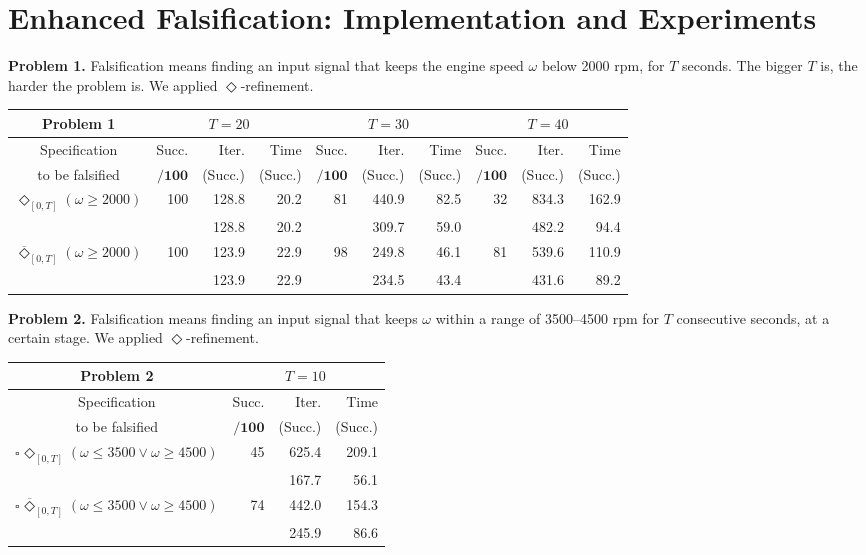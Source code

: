 \documentclass[envcountsect,orivec]{llncs} \usepackage{etex} \usepackage[]{graphicx}
\newcommand{\DiaOp}[1]{\Diamond_{#1}}
\newcommand{\BoxOp}[1]{\square_{#1}}
\newcommand{\TDiaOp}[1]{\overline{\Diamond}_{#1}}
\newcommand{\Succ}{Succ.}
\begin{document}
\section{Enhanced Falsification: Implementation and Experiments}
\label{sec:experiments}


\begin{table}[ptb]
  \scriptsize
  \centering
  \begin{minipage}{\textwidth}
    \textbf{Problem 1. } Falsification means finding an input signal 
    that keeps the engine speed $\omega$ below 2000 rpm, for $T$
    seconds. The bigger $T$ is, the harder the problem is.
    We applied $\Diamond$-refinement.
  \end{minipage}
  \begin{tabular}{c||r|r|r|r|r|r|r|r|r}
    \textbf{Problem 1}
    &\multicolumn{3}{|c|}{$T = 20$} &\multicolumn{3}{|c|}{$T = 30$} &\multicolumn{3}{|c}{$T = 40$}\\ \hline
    Specification & \Succ & Iter. & Time & \Succ & Iter. & Time &
    \Succ & Iter. & Time \\
    to be falsified
    & $\mathbf{/100}$ & (\Succ) & (\Succ) &$\mathbf{/100}$ & (\Succ) & (\Succ)&$\mathbf{/100}$  & (\Succ) & (\Succ)\\  \hline\hline
    $\DiaOp{[0,T]}{(\omega \geq 2000)}$ 
    & 100& 128.8& 20.2& 81& 440.9& 82.5& 32& 834.3& 162.9\\
    &    & 128.8& 20.2&   & 309.7& 59.0&   & 482.2&  94.4\\\hline
    $\TDiaOp{[0,T]}{(\omega \geq 2000)}$
    & 100& 123.9& 22.9& 98& 249.8& 46.1 & 81& 539.6& 110.9\\
    &    & 123.9& 22.9&   & 234.5& 43.4 &   & 431.6&  89.2\\
  \end{tabular}

  \vspace{1em}
  \begin{minipage}{\textwidth}
\textbf{Problem 2.} Falsification means finding an input signal 
    that keeps $\omega$ within a range of 3500--4500 rpm for $T$
    consecutive seconds, at a certain stage. 
We applied $\Diamond$-refinement.
  \end{minipage}
  \begin{tabular}{c||r|r|r}
    \textbf{Problem 2}
    &\multicolumn{3}{|c}{$T = 10$} \\ \hline
    Specification & \Succ & Iter. & Time\\
    to be falsified
    & $\mathbf{/100}$ & (\Succ) & (\Succ) \\  \hline\hline
    $\BoxOp{}\DiaOp{[0, T]}(\omega \leq 3500 \vee \omega \geq 4500)$
    & 45& 625.4& 209.1\\
    &   & 167.7&  56.1\\\hline
    $\BoxOp{}\TDiaOp{[0, T]}(\omega \leq 3500 \vee \omega \geq 4500)$
    & 74& 442.0&  154.3\\
    &   & 245.9&   86.6\\
  \end{tabular}


\end{table}
\end{document}
